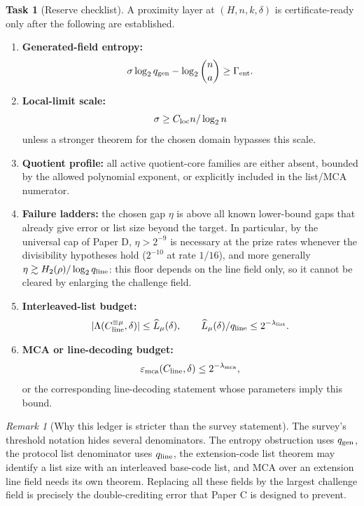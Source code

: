 \documentclass[11pt]{article}
\theoremstyle{definition}
\newtheorem{task}[theorem]{Task}
\theoremstyle{remark}
\newtheorem{remark}[theorem]{Remark}
\newcommand{\Int}[2]{#1^{\equiv #2}}
\newcommand{\emca}{\varepsilon_{\rm mca}}
\newcommand{\qgen}{q_{\rm gen}}
\newcommand{\qline}{q_{\rm line}}
\newcommand{\paperC}{Paper C}
\newcommand{\paperD}{Paper D}
\begin{document}
\begin{task}[Reserve checklist]
\label{task:reserve-checklist}
A proximity layer at $(H,n,k,\delta)$ is certificate-ready only after the following are established.
\begin{enumerate}[label=(\alph*),leftmargin=2.2em]
\item \textbf{Generated-field entropy:}
\[
        \sigma\log_2\qgen-\log_2\binom n a\ge \Gamma_{\rm ent}.
\]
\item \textbf{Local-limit scale:}
\[
        \sigma\ge C_{\rm loc} n/\log_2 n
\]
unless a stronger theorem for the chosen domain bypasses this scale.
\item \textbf{Quotient profile:} all active quotient-core families are either absent, bounded by the allowed polynomial exponent, or explicitly included in the list/MCA numerator.
\item \textbf{Failure ladders:} the chosen gap $\eta$ is above all known lower-bound gaps that already give error or list size beyond the target.  In particular, by the universal cap of \paperD, $\eta>2^{-9}$ is necessary at the prize rates whenever the divisibility hypotheses hold ($2^{-10}$ at rate $1/16$), and more generally $\eta\gtrsim H_2(\rho)/\log_2\qline$: this floor depends on the line field only, so it cannot be cleared by enlarging the challenge field.
\item \textbf{Interleaved-list budget:}
\[
        |\Lambda(\Int{C_{\rm line}}{\mu},\delta)|\le \widehat L_\mu(\delta),
        \qquad
        \widehat L_\mu(\delta)/\qline\le 2^{-\lambda_{\rm list}}.
\]
\item \textbf{MCA or line-decoding budget:}
\[
        \emca(C_{\rm line},\delta)\le 2^{-\lambda_{\rm mca}},
\]
or the corresponding line-decoding statement whose parameters imply this bound.
\end{enumerate}
\end{task}

\begin{remark}[Why this ledger is stricter than the survey statement]
The survey's threshold notation hides several denominators.  The entropy obstruction uses $\qgen$, the protocol list denominator uses $\qline$, the extension-code list theorem may identify a list size with an interleaved base-code list, and MCA over an extension line field needs its own theorem.  Replacing all these fields by the largest challenge field is precisely the double-crediting error that \paperC{} is designed to prevent.
\end{remark}
\end{document}
